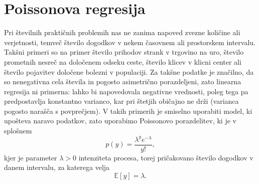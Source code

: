 \section{Poissonova regresija}

Pri številnih praktičnih problemih nas ne zanima napoved zvezne količine ali verjetnosti, temveč število dogodkov v nekem časovnem ali prostorskem intervalu. Takšni primeri so na primer število prihodov strank v trgovino na uro, število prometnih nesreč na določenem odseku ceste, število klicev v klicni center ali število pojavitev določene bolezni v populaciji. Za takšne podatke je značilno, da so nenegativna cela števila in pogosto asimetrično porazdeljeni, zato linearna regresija ni primerna: lahko bi napovedovala negativne vrednosti, poleg tega pa predpostavlja konstantno varianco, kar pri štetjih običajno ne drži (varianca pogosto narašča s povprečjem). V takih primerih je smiselno uporabiti model, ki upošteva naravo podatkov, zato uporabimo Poissonovo porazdelitev, ki je v splošnem
\[
p(y) = \frac{\lambda^y e^{-\lambda}}{y!},
\]
kjer je parameter $\lambda > 0$ intenziteta procesa, torej pričakovano število dogodkov v danem intervalu, za katerega velja
\[
\mathbb{E}[y] = \lambda.
\]

